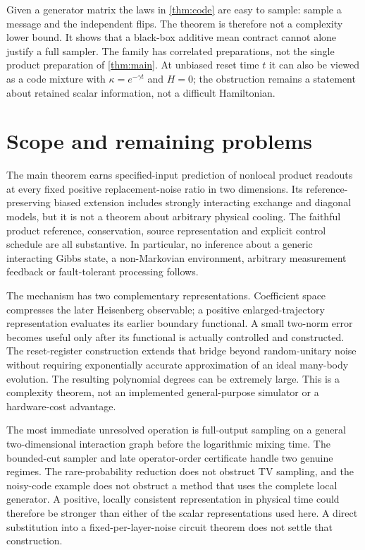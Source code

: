 \documentclass[11pt,reqno]{amsart}
\numberwithin{equation}{section}
\theoremstyle{definition}
\theoremstyle{remark}
\begin{document}
Given a generator matrix the laws in \cref{thm:code} are easy to sample: sample a message and the independent flips. The theorem is therefore not a complexity lower bound. It shows that a black-box additive mean contract cannot alone justify a full sampler. The family has correlated preparations, not the single product preparation of \cref{thm:main}. At unbiased reset time $t$ it can also be viewed as a code mixture with $\kappa=e^{-\gamma t}$ and $H=0$; the obstruction remains a statement about retained scalar information, not a difficult Hamiltonian.


\section{Scope and remaining problems}

The main theorem earns specified-input prediction of nonlocal product readouts at every fixed positive replacement-noise ratio in two dimensions. Its reference-preserving biased extension includes strongly interacting exchange and diagonal models, but it is not a theorem about arbitrary physical cooling. The faithful product reference, conservation, source representation and explicit control schedule are all substantive. In particular, no inference about a generic interacting Gibbs state, a non-Markovian environment, arbitrary measurement feedback or fault-tolerant processing follows.

The mechanism has two complementary representations. Coefficient space compresses the later Heisenberg observable; a positive enlarged-trajectory representation evaluates its earlier boundary functional. A small two-norm error becomes useful only after its functional is actually controlled and constructed. The reset-register construction extends that bridge beyond random-unitary noise without requiring exponentially accurate approximation of an ideal many-body evolution. The resulting polynomial degrees can be extremely large. This is a complexity theorem, not an implemented general-purpose simulator or a hardware-cost advantage.

The most immediate unresolved operation is full-output sampling on a general two-dimensional interaction graph before the logarithmic mixing time. The bounded-cut sampler and late operator-order certificate handle two genuine regimes. The rare-probability reduction does not obstruct TV sampling, and the noisy-code example does not obstruct a method that uses the complete local generator. A positive, locally consistent representation in physical time could therefore be stronger than either of the scalar representations used here. A direct substitution into a fixed-per-layer-noise circuit theorem does not settle that construction.
\end{document}
